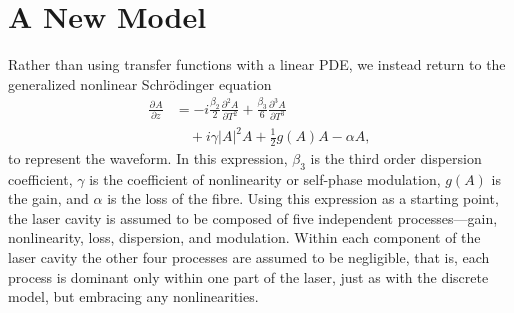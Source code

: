 \documentclass[%
 aps,
 jmp,%
 amsmath,amssymb,
 reprint,%
nofootinbib
]{revtex4-1}
\newcommand{\pdiff}[3][]{\frac{\partial^{#1}#2}{\partial{#3}^{#1}}}
\begin{document}
\section{A New Model}
Rather than using transfer functions with a linear PDE, we instead return to the generalized nonlinear Schr\"odinger equation~\cite{agrawal2013, ferreira, shtyrina, yarutkina} 
\begin{align}
\label{eq:nlse}
\pdiff{A}{z} &= - i \frac{\beta_2}{2}\pdiff[2]{A}{T} + \frac{\beta_3}{6}\pdiff[3]{A}{T} \\
\nonumber& \quad + i \gamma |A|^2 A + \frac{1}{2}g(A) A - \alpha A,
\end{align}
to represent the waveform. In this expression, $\beta_3$ is the third order dispersion coefficient, $\gamma$ is the coefficient of nonlinearity or self-phase modulation, $g(A)$ is the gain, and $\alpha$ is the loss of the fibre. Using this expression as a starting point, the laser cavity is assumed to be composed of five independent processes---gain, nonlinearity, loss, dispersion, and modulation. Within each component of the laser cavity the other four processes are assumed to be negligible, that is, each process is dominant only within one part of the laser, just as with the discrete model, but embracing any nonlinearities.
\end{document}
